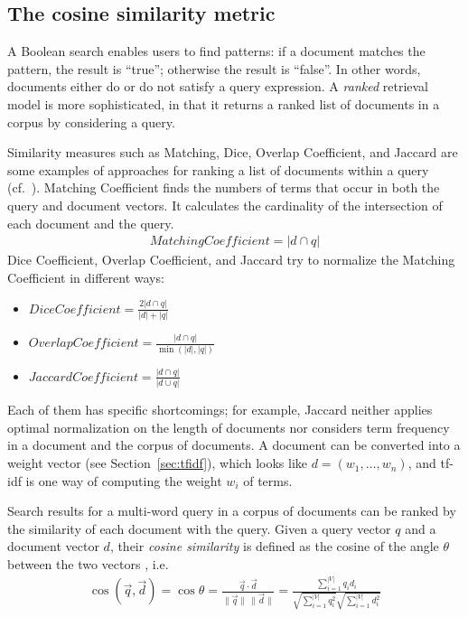 \documentclass{IOS-Book-Article}
\begin{document}
\subsection{The cosine similarity metric}
\label{sec:cosine}
A Boolean search enables users to find patterns: if a document matches the pattern, the result is “true”; otherwise the result is “false”.
In other words, documents either do or do not satisfy a query expression.
A \emph{ranked} retrieval model is more sophisticated, in that it returns a ranked list of documents in a corpus by considering a query. 

Similarity measures such as Matching, Dice, Overlap Coefficient, and Jaccard are some examples of approaches for ranking a list of documents within a query (cf.~\citet{ChristopherD1999}).
Matching Coefficient finds the numbers of terms that occur in both the query and document vectors.
It calculates the cardinality of the intersection of each document and the query.
\begin{align*}
\mathit{Matching Coefficient}=|d\cap q|
\end{align*}
Dice Coefficient, Overlap Coefficient, and Jaccard try to normalize the Matching Coefficient in different ways:
\begin{itemize}
	\item $\mathit{Dice Coefficient}=\frac{2|d\cap q|}{|d|+|q|}$
	\item $\mathit{Overlap Coefficient}=\frac{|d\cap q|}{\min(|d|,|q|)}$
	\item $\mathit{Jaccard Coefficient}=\frac{|d\cap q|}{|d\cup q|}$
\end{itemize}
Each of them has specific shortcomings;
for example, Jaccard neither applies optimal normalization on the length of documents nor considers term frequency in a document and the corpus of documents.
A document can be converted into a weight vector (see Section~\ref{sec:tfidf}), which looks like $d=(w_1,\dots,w_n)$, and tf-idf is one way of computing the weight $w_i$ of terms.

Search results for a multi-word query in a corpus of documents can be ranked by the similarity of each document with the query.
Given a query vector $q$ and a document vector $d$, their \emph{cosine similarity} is defined as the cosine of the angle $\theta$ between the two vectors \citep{SALTON1988,ChristopherD1999}, i.e.\
\begin{align*}
  \cos(\vec{q},\vec{d})=\cos \theta=\frac{\vec{q}\cdot \vec{d}}{\|\vec{q}\|\,\|\vec{d}\|}=
  \frac{\sum_{i=1}^{|V|} q_id_i}{\sqrt{\sum_{i=1}^{|V|} q_i^2}\sqrt{\sum_{i=1}^{|V|} d_i^2}}
\end{align*}
\end{document}
